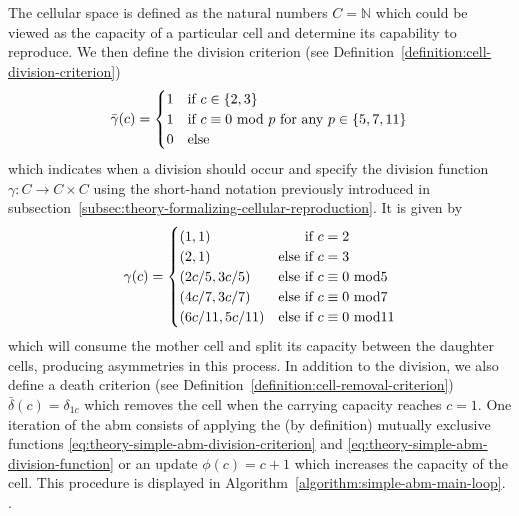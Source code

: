 \begin{example}
    \normalfont
    The cellular space is defined as the natural numbers $C=\mathbb{N}$ which could be viewed as the
    capacity of a particular cell and determine its capability to reproduce.
    We then define the division criterion (see Definition~\ref{definition:cell-division-criterion})
    \begin{equation}
        \bar{\gamma}(c) =
        \begin{cases}
            1 &\text{\normalfont{if} } c\in\{2,3\}\\
            1 &\text{\normalfont{if} } c\equiv0 \text{ \normalfont{mod} } p
            \text{ \normalfont{for any} } p\in\{5,7,11\}\\
            0 &\text{\normalfont{else}}
        \end{cases}
        \label{eq:theory-simple-abm-division-criterion}
    \end{equation}
    which indicates when a division should occur and specify the division function
    $\gamma:C\rightarrow C\times C$ using the short-hand notation previously introduced in
    subsection~\ref{subsec:theory-formalizing-cellular-reproduction}.
    It is given by
    \begin{equation}
        \gamma(c) =
        \begin{cases}
            (1,1)&\text{\normalfont{\phantom{else }if }}c=2\\
            (2,1)&\text{\normalfont{else if }}c=3\\
            (2c/5,3c/5)&\text{\normalfont{else if }}c\equiv0\text{ \normalfont{mod}}5\\
            (4c/7,3c/7)&\text{\normalfont{else if }}c\equiv0\text{ \normalfont{mod}}7\\
            (6c/11,5c/11)&\text{\normalfont{else if }}c\equiv0\text{ \normalfont{mod}}11\\
        \end{cases}
        \label{eq:theory-simple-abm-division-function}
    \end{equation}
    which will consume the mother cell and split its capacity between the daughter cells, producing
    asymmetries in this process.
    In addition to the division, we also define a death criterion (see
    Definition~\ref{definition:cell-removal-criterion}) $\bar{\delta}(c) = \delta_{1c}$ which
    removes the cell when the carrying capacity reaches $c=1$.
    One iteration of the \ac{abm} consists of applying the (by definition) mutually exclusive
    functions \eqref{eq:theory-simple-abm-division-criterion} and
    \eqref{eq:theory-simple-abm-division-function} or an update $\phi(c)=c+1$ which increases the
    capacity of the cell.
    This procedure is displayed in Algorithm~\ref{algorithm:simple-abm-main-loop}.
    \label{example:theory-simple-abm}.
\end{example}


